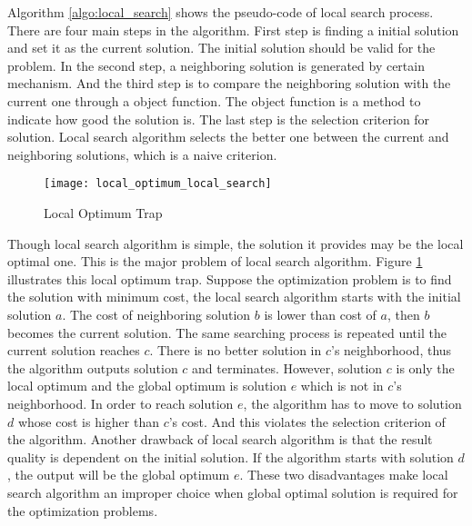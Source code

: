 		
		
		Algorithm \ref{algo:local_search} shows the pseudo-code of local search process. There are four main steps in the algorithm. First step is finding a initial solution and set it as the current solution. The initial solution should be valid for the problem. In the second step, a neighboring solution is generated by certain mechanism. And the third step is to compare the neighboring solution with the current one through a object function. The object function is a method to indicate how good the solution is. The last step is the selection criterion for solution. Local search algorithm selects the better one between the current and neighboring solutions, which is a naive criterion.
		
			\begin{figure}[H]
				\begin{center}
					\texttt{[image: local\_optimum\_local\_search]}
					\caption[Local Optimum Trap]{Local Optimum Trap}
					\label{fig:local_optimum_local_search}
				\end{center}
			\end{figure}
		
		Though local search algorithm is simple, the solution it provides may be the local optimal one. This is the major problem of
		local search algorithm. Figure \ref{fig:local_optimum_local_search} illustrates this local optimum trap. Suppose the
		optimization problem is to find the solution with minimum cost, the local search algorithm starts with the initial solution $a$.
		The cost of neighboring solution $b$ is lower than cost of $a$, then $b$ becomes the current solution. The same searching process 
		is repeated until the current solution reaches $c$. There is no better solution in $c$'s neighborhood, thus the algorithm outputs solution $c$ and terminates. However, solution $c$ is only the local optimum and the global optimum is solution $e$ which
		is not in $c$'s neighborhood. In order to reach solution $e$, the algorithm has to move to solution $d$ whose cost is higher than
		$c$'s cost. And this violates the selection criterion of the algorithm. Another drawback of local search algorithm is that the result quality is dependent on the initial solution. If the algorithm starts with solution $d$, the output will be the global optimum $e$. These two disadvantages make local search algorithm an improper choice when global optimal solution is required for 
		the optimization problems.
				
